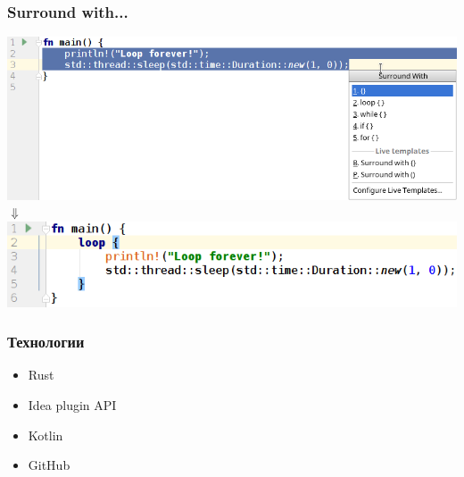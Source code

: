 \documentclass[10pt,pdf,hyperref={unicode}]{beamer}
\begin{document}
\begin{frame}
	\frametitle{Surround with...} 
	\includegraphics[scale = 0.4]{loop_before.png}\\
	{
		\centering $\Downarrow$ \\
	}
	\includegraphics[scale = 0.4]{loop_after.png}
\end{frame}

\begin{frame}
	\frametitle{Технологии} 
	\begin{itemize}
		\item Rust
		\item Idea plugin API
		\item Kotlin
		\item GitHub
	\end{itemize}
\end{frame}
\end{document}
